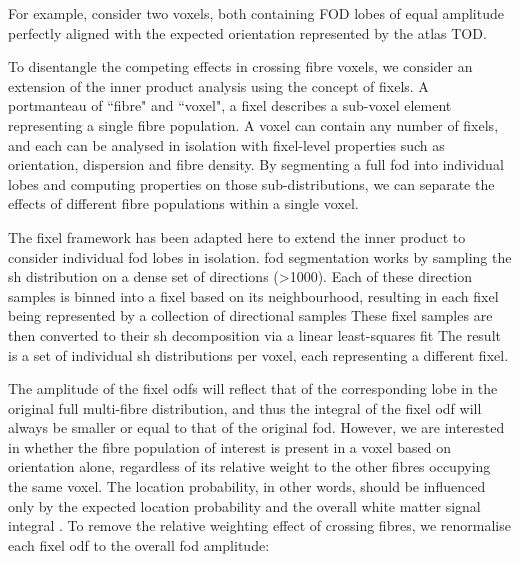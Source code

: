 
For example, consider two voxels, both containing FOD lobes of equal amplitude perfectly aligned with the expected orientation represented by the atlas TOD.

To disentangle the competing effects in crossing fibre voxels, we consider an extension of the inner product analysis using the concept of fixels.
A portmanteau of ``fibre" and ``voxel", a fixel describes a sub-voxel element representing a single fibre population.
A voxel can contain any number of fixels, and each can be analysed in isolation with fixel-level properties such as orientation, dispersion and fibre density.
By segmenting a full \gls{fod} into individual lobes and computing properties on those sub-distributions, we can separate the effects of different fibre populations within a single voxel.

The fixel framework has been adapted here to extend the inner product to consider individual \gls{fod} lobes in isolation.
\gls{fod} segmentation works by sampling the \gls{sh} distribution on a dense set of directions (>1000).
Each of these direction samples is binned into a fixel based on its neighbourhood, resulting in each fixel being represented by a collection of directional samples 
These fixel samples are then converted to their \gls{sh} decomposition via a linear least-squares fit 
The result is a set of individual \gls{sh} distributions per voxel, each representing a different fixel.

The amplitude of the fixel \glspl{odf} will reflect that of the corresponding lobe in the original full multi-fibre distribution, and thus the integral of the fixel \gls{odf} will always be smaller or equal to that of the original \gls{fod}.
However, we are interested in whether the fibre population of interest is present in a voxel based on orientation alone, regardless of its relative weight to the other fibres occupying the same voxel.
The location probability, in other words, should be influenced only by the expected location probability  and the overall white matter signal integral .
To remove the relative weighting effect of crossing fibres, we renormalise each fixel \gls{odf} to the overall \gls{fod} amplitude:

